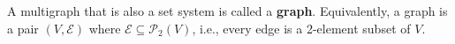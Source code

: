 A multigraph that is also a set system is called a \textbf{graph}. Equivalently, a graph is a pair $(V, \mathcal{E})$ where $\mathcal{E} \subseteq \mathcal{P}_2(V)$, i.e., every edge is a 2-element subset of $V$.
